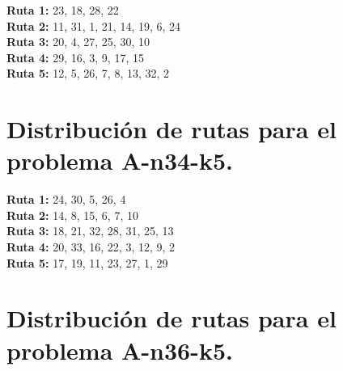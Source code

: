 \documentclass[a4paper,10pt,twocolumn]{article}
\begin{document}
	\hspace{-10pt}\textbf{Ruta 1:} 23, 18, 28, 22 \\
	\textbf{Ruta 2:} 11, 31, 1, 21, 14, 19, 6, 24 \\
	\textbf{Ruta 3:} 20, 4, 27, 25, 30, 10 \\
	\textbf{Ruta 4:} 29, 16, 3, 9, 17, 15 \\
	\textbf{Ruta 5:} 12, 5, 26, 7, 8, 13, 32, 2 \\

	
	\section*{Distribución de rutas para el problema A-n34-k5.}
	\label{tab:result34_5}
	
	\hspace{-10pt}\textbf{Ruta 1:} 24, 30, 5, 26, 4 \\
	\textbf{Ruta 2:} 14, 8, 15, 6, 7, 10 \\
	\textbf{Ruta 3:} 18, 21, 32, 28, 31, 25, 13 \\
	\textbf{Ruta 4:} 20, 33, 16, 22, 3, 12, 9, 2 \\
	\textbf{Ruta 5:} 17, 19, 11, 23, 27, 1, 29 \\

	
	\section*{Distribución de rutas para el problema A-n36-k5.}
	\label{tab:result36_5}
	
\end{document}
